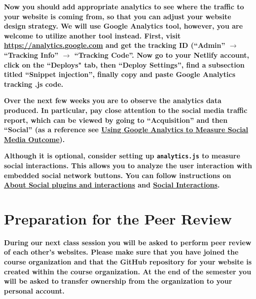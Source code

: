 \documentclass[11pt]{article}
\begin{document}
\textbf{Now you should add appropriate analytics to see where the traffic  to your website is coming from, so that you can adjust your website design strategy. We will use Google Analytics tool, however, you are welcome to utilize another tool instead. First, visit \href{Google Analytics site}{https://analytics.google.com} and get the tracking ID (``Admin'' $\rightarrow$ ``Tracking Info'' $\rightarrow$ ``Tracking Code''. Now go to your Netlify account, click on the ``Deploys" tab, then ``Deploy Settings'', find a subsection titled ``Snippet injection'', finally copy and paste Google Analytics tracking .js code. }

\textbf{Over the next few weeks you are to observe the analytics data produced. In particular, pay close attention to the social media traffic report, which can be viewed by going to ``Acquisition'' and then ``Social'' (as a reference see \href{https://www.linkedin.com/pulse/using-google-analytics-measure-social-media-outcome-priyanka-gupta/}{Using Google Analytics to Measure Social Media Outcome}).} 

\textbf{Although it is optional,  consider setting up {\tt analytics.js} to measure social interactions. This allows you to analyze the user interaction with embedded social network buttons. You can follow instructions on \href{https://support.google.com/analytics/answer/6209874}{About Social plugins and interactions} and \href{https://developers.google.com/analytics/devguides/collection/analyticsjs/social-interactions}{Social Interactions}.}




\vspace{-0.05in}
\section*{Preparation for the Peer Review}

\textbf{During our next class session you will be asked to perform peer review of each other's websites. Please make sure  that you have joined the course organization and that the GitHub repository for your website is created within the course organization. At the end of the semester you will be asked to transfer ownership from the organization to your personal account.  }
\end{document}

